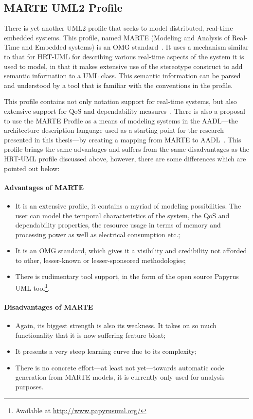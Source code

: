 \subsection{MARTE UML2 Profile}
There is yet another UML2 profile that seeks to model distributed,
real-time embedded systems. This profile, named MARTE (Modeling and
Analysis of Real-Time and Embedded systems) is an OMG
standard~\cite{omg-marte}. It uses a mechanism similar to that for
HRT-UML for describing various real-time aspects of the system it is
used to model, in that it makes extensive use of the stereotype
construct to add semantic information to a UML class. This semantic
information can be parsed and understood by a tool that is familiar
with the conventions in the profile.

This profile contains not only notation support for real-time systems,
but also extensive support for QoS and dependability
measures~\cite{bernardi@wosp07}. There is also a proposal to use the
MARTE Profile as a means of modeling systems in the AADL---the
architecture description language used as a starting point for the
research presented in this thesis---by creating a mapping from MARTE
to AADL~\cite{gerard@iceccs07}. This profile brings the same
advantages and suffers from the same disadvantages as the HRT-UML
profile discussed above, however, there are some differences which are
pointed out below:

\paragraph{Advantages of MARTE}
\begin{itemize}
\item{It is an extensive profile, it contains a myriad of modeling
  possibilities. The user can model the temporal characteristics of
  the system, the QoS and dependability properties, the resource usage
  in terms of memory and processing power as well as electrical
  consumption etc.;}
\item{It is an OMG standard, which gives it a visibility and
  credibility not afforded to other, lesser-known or lesser-sponsored
  methodologies;}
\item{There is rudimentary tool support, in the form of the open
  source Papyrus UML tool\footnote{Available at
    \url{http://www.papyrusuml.org/}}.}
\end{itemize}
\paragraph{Disadvantages of MARTE}
\begin{itemize}
\item{Again, its biggest strength is also its weakness. It takes on so
  much functionality that it is now suffering feature bloat;}
\item{It presents a very steep learning curve due to its complexity;}
\item{There is no concrete effort---at least not yet---towards
  automatic code generation from MARTE models, it is currently only
  used for analysis purposes.}
\end{itemize}

